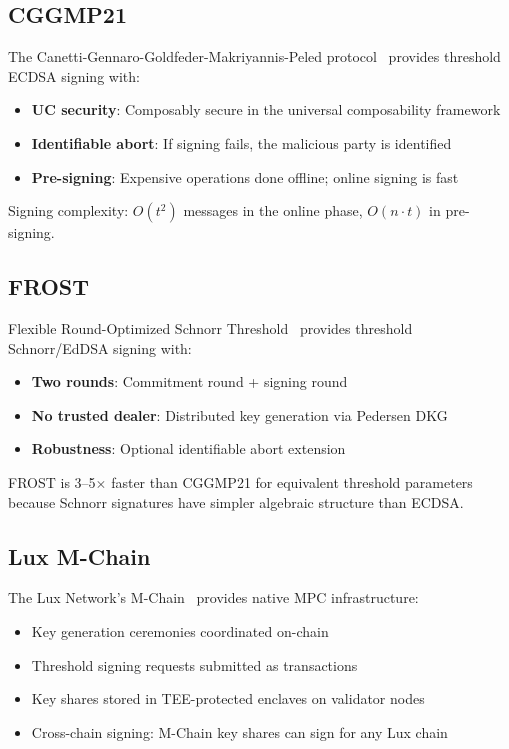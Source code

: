 \documentclass[11pt,letterpaper]{article}
\begin{document}
\subsection{CGGMP21}

The Canetti-Gennaro-Goldfeder-Makriyannis-Peled protocol~\cite{cggmp2021} provides threshold ECDSA signing with:

\begin{itemize}
    \item \textbf{UC security}: Composably secure in the universal composability framework
    \item \textbf{Identifiable abort}: If signing fails, the malicious party is identified
    \item \textbf{Pre-signing}: Expensive operations done offline; online signing is fast
\end{itemize}

Signing complexity: $O(t^2)$ messages in the online phase, $O(n \cdot t)$ in pre-signing.

\subsection{FROST}

Flexible Round-Optimized Schnorr Threshold~\cite{komlo2020frost} provides threshold Schnorr/EdDSA signing with:

\begin{itemize}
    \item \textbf{Two rounds}: Commitment round + signing round
    \item \textbf{No trusted dealer}: Distributed key generation via Pedersen DKG
    \item \textbf{Robustness}: Optional identifiable abort extension
\end{itemize}

FROST is 3--5$\times$ faster than CGGMP21 for equivalent threshold parameters because Schnorr signatures have simpler algebraic structure than ECDSA.

\subsection{Lux M-Chain}

The Lux Network's M-Chain~\cite{lux-mchain-mpc} provides native MPC infrastructure:

\begin{itemize}
    \item Key generation ceremonies coordinated on-chain
    \item Threshold signing requests submitted as transactions
    \item Key shares stored in TEE-protected enclaves on validator nodes
    \item Cross-chain signing: M-Chain key shares can sign for any Lux chain
\end{itemize}
\end{document}
